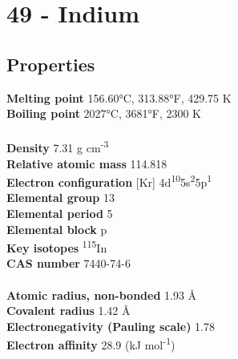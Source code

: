 \section{49 - Indium}
\label{sec:elem-indium}
\subsection{Properties}
\textbf{Melting point} 156.60°C, 313.88°F, 429.75 K\\
\textbf{Boiling point} 2027°C, 3681°F, 2300 K\\
\\
\textbf{Density} 7.31 g cm\textsuperscript{-3}\\
\textbf{Relative atomic mass} 114.818\\
\textbf{Electron configuration} [Kr] 4d\textsuperscript{10}5s\textsuperscript{2}5p\textsuperscript{1}\\
\textbf{Elemental group} 13\\
\textbf{Elemental period} 5\\
\textbf{Elemental block} p\\
\textbf{Key isotopes} \textsuperscript{115}In\\
\textbf{CAS number} 7440-74-6\\
\\
\textbf{Atomic radius, non-bonded} 1.93 Å\\
\textbf{Covalent radius} 1.42 Å\\
\textbf{Electronegativity (Pauling scale)} 1.78\\
\textbf{Electron affinity} 28.9 (kJ mol\textsuperscript{-1})\\